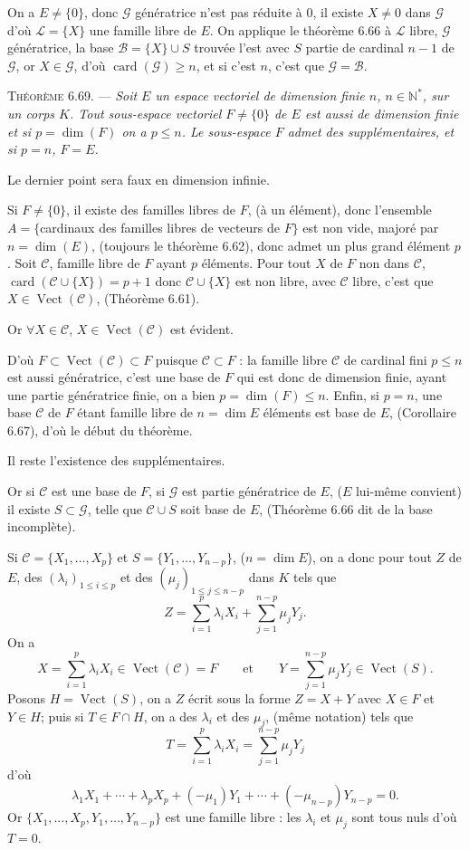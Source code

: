 On a $E\ne\{0\}$, donc $\mathcal G$ génératrice n'est pas réduite à 0, il existe $X\ne0$ dans $\mathcal G$ d'où $\mathcal L=\{X\}$ une famille libre de $E$. On applique le théorème 6.66 à $\mathcal L$ libre, $\mathcal G$ génératrice, la base $\mathcal B=\{X\}\cup S$ trouvée l'est avec $S$ partie de cardinal $n-1$ de $\mathcal G$, or $X\in\mathcal G$, d'où $\operatorname{card}(\mathcal G)\ge n$, et si c'est $n$, c'est que $\mathcal G=\mathcal B$. \bookend

\medskip\noindent\textsc{Théorème 6.69.} --- \emph{Soit $E$ un espace vectoriel de dimension finie $n$, $n\in\mathbb N^*$, sur un corps $K$. Tout sous-espace vectoriel $F\ne\{0\}$ de $E$ est aussi de dimension finie et si $p=\dim(F)$ on a $p\le n$. Le sous-espace $F$ admet des supplémentaires, et si $p=n$, $F=E$.}

Le dernier point sera faux en dimension infinie.

Si $F\ne\{0\}$, il existe des familles libres de $F$, (à un élément), donc l'ensemble $A=\{$cardinaux des familles libres de vecteurs de $F\}$ est non vide, majoré par $n=\dim(E)$, (toujours le théorème 6.62), donc admet un plus grand élément $p$. Soit $\mathcal C$, famille libre de $F$ ayant $p$ éléments. Pour tout $X$ de $F$ non dans $\mathcal C$, $\operatorname{card}(\mathcal C\cup\{X\})=p+1$ donc $\mathcal C\cup\{X\}$ est non libre, avec $\mathcal C$ libre, c'est que $X\in\operatorname{Vect}(\mathcal C)$, (Théorème 6.61).

Or $\forall X\in\mathcal C$, $X\in\operatorname{Vect}(\mathcal C)$ est évident.

D'où $F\subset\operatorname{Vect}(\mathcal C)\subset F$ puisque $\mathcal C\subset F$ : la famille libre $\mathcal C$ de cardinal fini $p\le n$ est aussi génératrice, c'est une base de $F$ qui est donc de dimension finie, ayant une partie génératrice finie, on a bien $p=\dim(F)\le n$. Enfin, si $p=n$, une base $\mathcal C$ de $F$ étant famille libre de $n=\dim E$ éléments est base de $E$, (Corollaire 6.67), d'où le début du théorème.

Il reste l'existence des supplémentaires.

Or si $\mathcal C$ est une base de $F$, si $\mathcal G$ est partie génératrice de $E$, ($E$ lui-même convient) il existe $S\subset\mathcal G$, telle que $\mathcal C\cup S$ soit base de $E$, (Théorème 6.66 dit de la base incomplète).

Si $\mathcal C=\{X_1,\ldots,X_p\}$ et $S=\{Y_1,\ldots,Y_{n-p}\}$, ($n=\dim E$), on a donc pour tout $Z$ de $E$, des $(\lambda_i)_{1\le i\le p}$ et des $(\mu_j)_{1\le j\le n-p}$ dans $K$ tels que
\[
Z=\sum_{i=1}^p\lambda_iX_i+\sum_{j=1}^{n-p}\mu_jY_j.
\]
On a
\[
X=\sum_{i=1}^p\lambda_iX_i\in\operatorname{Vect}(\mathcal C)=F
\qquad\text{et}\qquad
Y=\sum_{j=1}^{n-p}\mu_jY_j\in\operatorname{Vect}(S).
\]
Posons $H=\operatorname{Vect}(S)$, on a $Z$ écrit sous la forme $Z=X+Y$ avec $X\in F$ et $Y\in H$; puis si $T\in F\cap H$, on a des $\lambda_i$ et des $\mu_j$, (même notation) tels que
\[
T=\sum_{i=1}^p\lambda_iX_i=\sum_{j=1}^{n-p}\mu_jY_j
\]
d'où
\[
\lambda_1X_1+\cdots+\lambda_pX_p+(-\mu_1)Y_1+\cdots+(-\mu_{n-p})Y_{n-p}=0.
\]
Or $\{X_1,\ldots,X_p,Y_1,\ldots,Y_{n-p}\}$ est une famille libre : les $\lambda_i$ et $\mu_j$ sont tous nuls d'où $T=0$.

